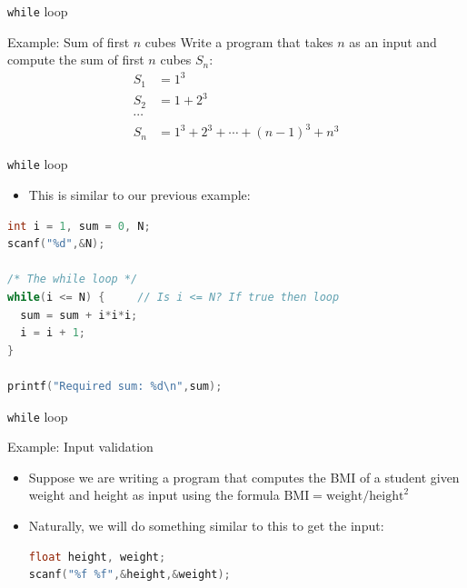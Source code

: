 \documentclass[10pt,xcolor={table,dvipsnames},t]{beamer}
\begin{document}
\begin{frame}{\texttt{while} loop}
  \begin{exampleblock}{Example: Sum of first $n$ cubes}
    Write a program that takes $n$ as an input and compute the sum of first $n$ cubes $S_n$:
    \begin{align*}
      S_1 &= 1^3\\
      S_2 &= 1 + 2^3\\
      \cdots \\ 
      S_n &= 1^3 + 2^3 + \cdots  + (n-1)^3 + n^3
    \end{align*}
  \end{exampleblock}
\end{frame}

\begin{frame}[fragile]{\texttt{while} loop}
  \begin{itemize}
    \item This is similar to our previous example:
  \end{itemize}
\begin{lstlisting}[language=C]
int i = 1, sum = 0, N;
scanf("%d",&N);

/* The while loop */
while(i <= N) {     // Is i <= N? If true then loop
  sum = sum + i*i*i;
  i = i + 1;
}

printf("Required sum: %d\n",sum);
\end{lstlisting}
\end{frame}

\begin{frame}[fragile]{\texttt{while} loop}
  \begin{exampleblock}{Example: Input validation}
    \begin{itemize}
      \item Suppose we are writing a program that computes the BMI of a student given weight and height as input using the formula $\text{BMI} = \text{weight}/\text{height}^2$
      \item Naturally, we will do something similar to this to get the input:
\begin{lstlisting}[language=C]
float height, weight;
scanf("%f %f",&height,&weight);
\end{lstlisting}
    \end{itemize}
  \end{exampleblock}
\end{frame}
\end{document}
